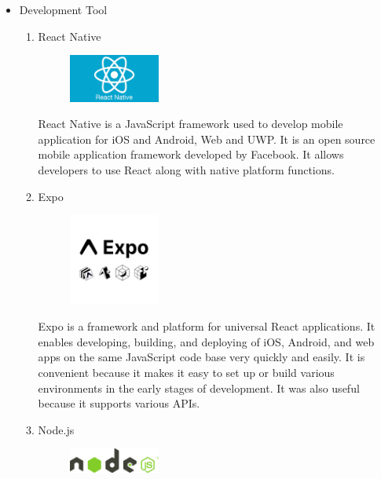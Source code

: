 \documentclass[conference]{IEEEtran}
\begin{document}
\begin{itemize}
\item Development Tool
\begin{enumerate}
\setlength{\parindent}{2ex}
\setlength{\parskip}{0.5em}

\item React Native
\par \begin{figure}[h!]
\includegraphics[width=3cm]{image/React Native.jpg}
\centering
\end{figure}

React Native is  a JavaScript framework used to develop mobile application for iOS and Android, Web and UWP. It is an open source mobile application framework developed by Facebook. It allows developers to use React along with native platform functions.

\item Expo
\par \begin{figure}[h!]
\includegraphics[width=3cm]{image/Expo.png}
\centering
\end{figure}

Expo is a framework and platform for universal React applications. It enables developing, building, and deploying of iOS, Android, and web apps on the same JavaScript code base very quickly and easily. It is convenient because it makes it easy to set up or build various environments in the early stages of development. It was also useful because it supports various APIs.

\item Node.js
\par \begin{figure}[h!]
\includegraphics[width=3cm]{image/Node.js.png}
\centering
\end{figure}


\end{enumerate}
\end{itemize}
\end{document}

